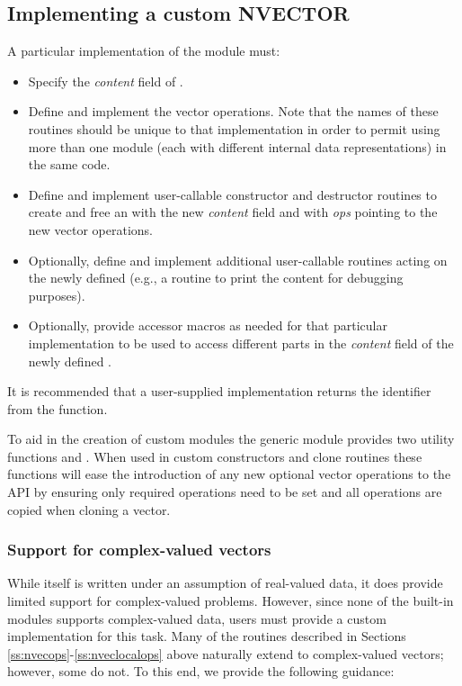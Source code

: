 \subsection{Implementing a custom NVECTOR}
\label{ss:nvector_custom_implmentation}

A particular implementation of the {\nvector} module must:

\begin{itemize}
\item Specify the {\em content} field of .
\item Define and implement the vector operations.
  Note that the names of these routines should be unique to that implementation in order
  to permit using more than one {\nvector} module (each with different 
  internal data representations) in the same code.
\item Define and implement user-callable constructor and destructor
  routines to create and free an  with
  the new {\em content} field and with {\em ops} pointing to the
  new vector operations.
\item Optionally, define and implement additional user-callable routines
  acting on the newly defined  (e.g., a routine to print
  the content for debugging purposes).
\item Optionally, provide accessor macros as needed for that particular implementation to
  be used to access different parts in the {\em content} field of the newly defined .
\end{itemize}

It is recommended that a user-supplied {\nvector} implementation returns the
 identifier from the  function.

To aid in the creation of custom {\nvector} modules the generic {\nvector}
module provides two utility functions  and .
When used in custom {\nvector} constructors and clone routines these functions
will ease the introduction of any new optional vector operations to the
{\nvector} API by ensuring only required operations need to be set and all
operations are copied when cloning a vector.


\subsubsection{Support for complex-valued vectors}

While {\sundials} itself is written under an assumption of real-valued
data, it does provide limited support for complex-valued problems.
However, since none of the built-in {\nvector} modules supports
complex-valued data, users must provide a custom {\nvector}
implementation for this task.  Many of the {\nvector} routines
described in Sections \ref{ss:nvecops}-\ref{ss:nveclocalops} above
naturally extend to complex-valued vectors; however, some do not.  To
this end, we provide the following guidance:

